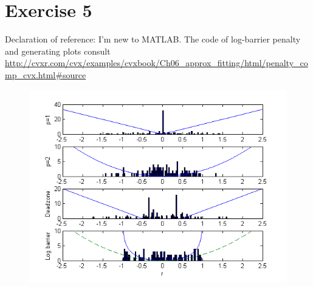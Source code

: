 \documentclass[12pt,a4paper]{article}
\begin{document}
\section*{Exercise 5}
Declaration of reference: I'm new to MATLAB. The code of log-barrier penalty and generating plots consult \url{http://cvxr.com/cvx/examples/cvxbook/Ch06_approx_fitting/html/penalty_comp_cvx.html#source}
\begin{figure}
	
	\includegraphics[width=\textwidth]{fig.png}
\end{figure}
\end{document}
